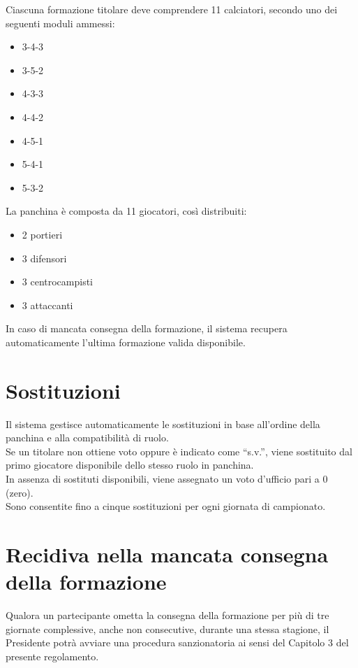 Ciascuna formazione titolare deve comprendere 11 calciatori, secondo uno dei seguenti moduli ammessi:

\begin{itemize}
\item 3-4-3
\item 3-5-2
\item 4-3-3
\item 4-4-2
\item 4-5-1
\item 5-4-1
\item 5-3-2
\end{itemize}

\noindent
La panchina è composta da 11 giocatori, così distribuiti:

\begin{itemize}
\item 2 portieri
\item 3 difensori
\item 3 centrocampisti
\item 3 attaccanti
\end{itemize}

In caso di mancata consegna della formazione, il sistema recupera automaticamente l'ultima formazione valida disponibile.

\section{Sostituzioni}
\label{art:4.6}

Il sistema gestisce automaticamente le sostituzioni in base all'ordine della panchina e alla compatibilità di ruolo.\\
Se un titolare non ottiene voto oppure è indicato come “s.v.”, viene sostituito dal primo giocatore disponibile dello stesso ruolo in panchina.\\
In assenza di sostituti disponibili, viene assegnato un voto d'ufficio pari a 0 (zero).\\
Sono consentite fino a cinque sostituzioni per ogni giornata di campionato.

\section{Recidiva nella mancata consegna della formazione}
\label{art:4.7}

Qualora un partecipante ometta la consegna della formazione per più di tre giornate complessive, anche non consecutive, durante una stessa stagione, il Presidente potrà avviare una procedura sanzionatoria ai sensi del Capitolo 3 del presente regolamento.


